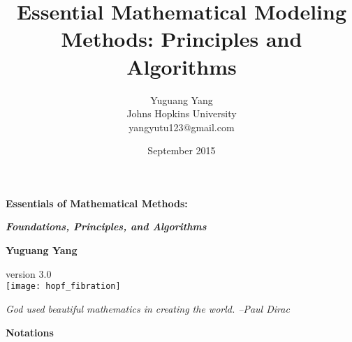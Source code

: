 \documentclass[oneside,hidelinks,12pt,letterpaper]{scrbook} %
\title{\huge \textbf{Essential Mathematical Modeling Methods: Principles and Algorithms}}
\author{Yuguang Yang \\
Johns Hopkins University \\yangyutu123@gmail.com }
\date{September 2015}
\theoremstyle{remark}
\theoremstyle{coloredRemark}
\theoremstyle{coloredNote}
\begin{document}
\sloppy


\begin{titlepage}
    \begin{center}
        \vspace*{1cm}
        
        {\huge \textbf{Essentials of Mathematical Methods:}} 
        
        \vspace{0.8cm}
        
        {\Large \textbf{\textit{Foundations, Principles, and Algorithms}}}
        
        
        \vspace{1.5cm}
       {\large\textbf{Yuguang Yang}}\\
       \vspace{0.5cm}
       
       version 3.0 \\
\vspace{0.4cm}
        	\texttt{[image: hopf\_fibration]}
       \vspace{0.4cm} 
         
    {\textit{God used beautiful mathematics in creating the world. --Paul Dirac}}\\
        
    \end{center}





\end{titlepage}


\newpage



\newpage




\newpage

\begin{center}
	\Large
	\textbf{\huge Notations}
	
	\vspace{0.4cm}
	\large
	
	\vspace{0.4cm}
\end{center}
\end{document}
